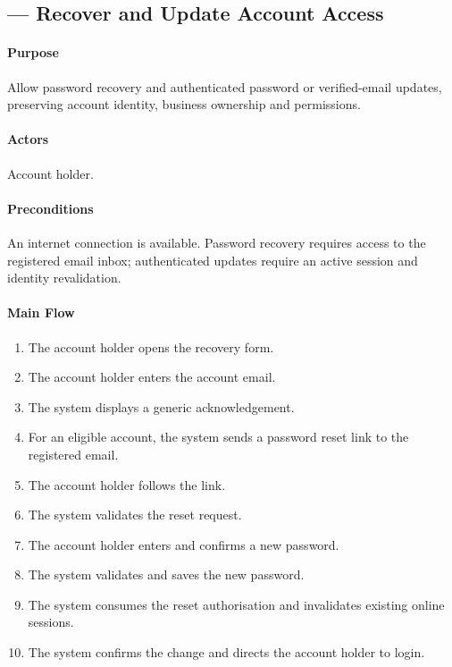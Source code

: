 \subsection{ --- Recover and Update Account Access}
\label{uc:recover-access}
\label{uc:03}

\paragraph{Purpose}

Allow password recovery and authenticated password or verified-email updates,
    preserving account identity, business ownership and permissions.

\paragraph{Actors}

Account holder.

\paragraph{Preconditions}

An internet connection is available.
    Password recovery requires access to the registered email inbox;
    authenticated updates require an active session and identity revalidation.

\paragraph{Main Flow}

\begin{enumerate}
        \item The account holder opens the recovery form.
        \item The account holder enters the account email.
        \item The system displays a generic acknowledgement.
        \item For an eligible account, the system sends
        a password reset link to the registered email.
        \item The account holder follows the link.
        \item The system validates the reset request.
        \item The account holder enters and confirms
        a new password.
        \item The system validates and saves the new password.
        \item The system consumes the reset authorisation
        and invalidates existing online sessions.
        \item The system confirms the change and directs
        the account holder to login.
    \end{enumerate}

